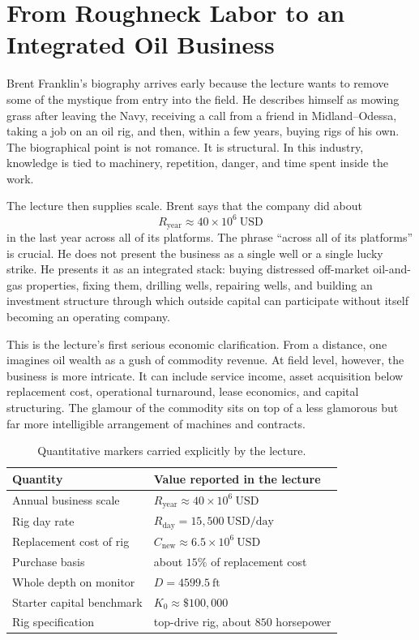 \section{From Roughneck Labor to an Integrated Oil Business}

Brent Franklin's biography arrives early because the lecture wants to remove some of the mystique from entry into the field. He describes himself as mowing grass after leaving the Navy, receiving a call from a friend in Midland--Odessa, taking a job on an oil rig, and then, within a few years, buying rigs of his own. The biographical point is not romance. It is structural. In this industry, knowledge is tied to machinery, repetition, danger, and time spent inside the work.

The lecture then supplies scale. Brent says that the company did about
\begin{equation}
R_{\mathrm{year}} \approx 40 \times 10^6\ \mathrm{USD}
\end{equation}
in the last year across all of its platforms. The phrase ``across all of its platforms'' is crucial. He does not present the business as a single well or a single lucky strike. He presents it as an integrated stack: buying distressed off-market oil-and-gas properties, fixing them, drilling wells, repairing wells, and building an investment structure through which outside capital can participate without itself becoming an operating company.

This is the lecture's first serious economic clarification. From a distance, one imagines oil wealth as a gush of commodity revenue. At field level, however, the business is more intricate. It can include service income, asset acquisition below replacement cost, operational turnaround, lease economics, and capital structuring. The glamour of the commodity sits on top of a less glamorous but far more intelligible arrangement of machines and contracts.

\begin{table}[h]
\centering
\begin{tabular}{|l|l|}
\hline
Quantity & Value reported in the lecture \\
\hline
Annual business scale & \(R_{\mathrm{year}} \approx 40 \times 10^6\ \mathrm{USD}\) \\
Rig day rate & \(R_{\mathrm{day}} = 15{,}500\ \mathrm{USD/day}\) \\
Replacement cost of rig & \(C_{\mathrm{new}} \approx 6.5 \times 10^6\ \mathrm{USD}\) \\
Purchase basis & about \(15\%\) of replacement cost \\
Whole depth on monitor & \(D = 4599.5\ \mathrm{ft}\) \\
Starter capital benchmark & \(K_0 \approx \$100{,}000\) \\
Rig specification & top-drive rig, about \(850\) horsepower \\
\hline
\end{tabular}
\caption{Quantitative markers carried explicitly by the lecture.}
\end{table}

